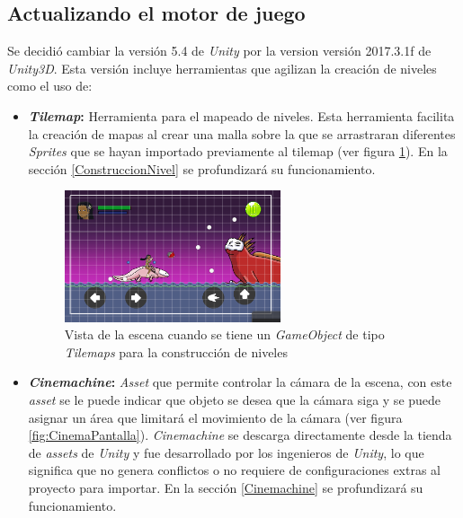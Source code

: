 \subsection{Actualizando el motor de juego}
Se decidió cambiar la versión 5.4 de \textit{Unity} por la version versión
2017.3.1f de \textit{Unity3D}. Esta versión incluye herramientas que agilizan la
creación de niveles como el uso de:
    \begin{itemize}
        \item \textbf{\textit{Tilemap}:} Herramienta para el mapeado de niveles. Esta
        herramienta facilita la creación de mapas al crear una malla sobre la que
        se arrastraran diferentes \textit{Sprites} que se hayan importado previamente
        al tilemap (ver figura \ref{fig:TilemapPantalla}). En la sección
        \ref{ConstruccionNivel} se profundizará su funcionamiento.
        
        \begin{figure}[h]
                \centering
                \includegraphics[width=0.6\textwidth]{02Antecedentes/Imagenes/tilemaps01.png}
                \caption{Vista de la escena cuando se tiene un \textit{GameObject} de
                tipo \textit{Tilemaps} para la construcción de niveles}
                \label{fig:TilemapPantalla}
        \end{figure}
        
        \item \textbf{\textit{Cinemachine}:} \textit{Asset} que permite controlar la
        cámara de la escena, con este \textit{asset} se le puede indicar que objeto se
        desea que la cámara siga y se puede asignar un área que limitará el movimiento
        de la cámara (ver figura \ref{fig:CinemaPantalla}). \textit{Cinemachine} se
        descarga directamente desde la tienda de \textit{assets} de \textit{Unity} y
        fue desarrollado por los ingenieros de \textit{Unity}, lo que significa que
        no genera conflictos o no requiere de configuraciones extras al proyecto para
        importar. En la sección \ref{Cinemachine} se profundizará su funcionamiento.
            

\end{itemize}
